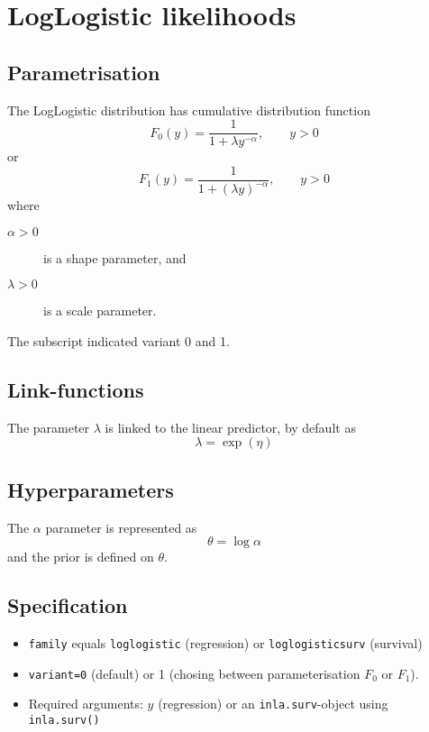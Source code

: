 \documentclass[a4paper,11pt]{article}
\begin{document}
\section*{LogLogistic likelihoods}

\subsection*{Parametrisation}

The LogLogistic distribution has cumulative distribution function
\begin{displaymath}
    F_0(y) = \frac{1}{1 + \lambda y^{-\alpha}}, \qquad y > 0
\end{displaymath}
or 
\begin{displaymath}
    F_1(y) = \frac{1}{1 + (\lambda y)^{-\alpha}}, \qquad y > 0
\end{displaymath}
where
\begin{description}
\item[$\alpha > 0$] is a shape parameter, and
\item[$\lambda > 0$] is a scale parameter.
\end{description}
The subscript indicated variant 0 and 1. 


\subsection*{Link-functions}

The parameter $\lambda$ is linked to the linear predictor, by default as
\[
\lambda = \exp(\eta)
\]

\subsection*{Hyperparameters}

The $\alpha$ parameter is represented as
\[
\theta = \log\alpha
\]
and the prior is defined on $\theta$.

\subsection*{Specification}

\begin{itemize}
\item \texttt{family} equals \texttt{loglogistic} (regression) or
    \texttt{loglogisticsurv} (survival)
\item \texttt{variant=0} (default) or 1 (chosing between parameterisation $F_0$
    or $F_1$).
\item Required arguments: $y$ (regression) or an
    \texttt{inla.surv}-object using \texttt{inla.surv()}
\end{itemize}
\end{document}

